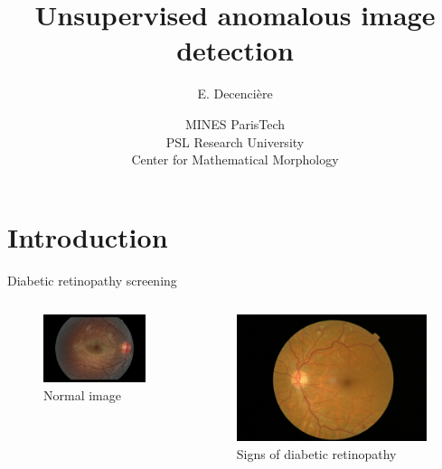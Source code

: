 \documentclass[xcolor=pdftex,dvipsnames,table,mathserif]{beamer}
\title{Unsupervised anomalous image detection}
\author{E. Decencière}
\date{MINES ParisTech\\
  PSL Research University\\
  Center for Mathematical Morphology
}
\begin{document}
\frame{\titlepage}


\section{Introduction}

\begin{frame}{Diabetic retinopathy screening}

  \begin{columns}
    \begin{column}{.5\textwidth}
  \begin{figure}[ht]
    \centering
    \includegraphics[width=\textwidth]{fundus1}
    \caption*{Normal image}
  \end{figure}

    \end{column}

    \begin{column}{.5\textwidth}

\begin{figure}[ht]
  \centering
  \includegraphics[width=\textwidth]{ret-dr}
  \caption*{Signs of diabetic retinopathy}
\end{figure}



\end{column}
\end{columns}
\end{frame}
\end{document}
